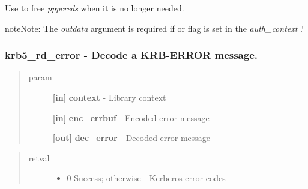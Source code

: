 \documentclass[letterpaper,10pt,english]{sphinxmanual}
\begin{document}
Use {\hyperref[appdev/refs/api/krb5_free_tgt_creds:krb5_free_tgt_creds]{}} to free \emph{pppcreds} when it is no longer needed.

\begin{notice}{note}{Note:}
The \emph{outdata} argument is required if {\hyperref[appdev/refs/macros/KRB5_AUTH_CONTEXT_RET_TIME:KRB5_AUTH_CONTEXT_RET_TIME]{}} or {\hyperref[appdev/refs/macros/KRB5_AUTH_CONTEXT_RET_SEQUENCE:KRB5_AUTH_CONTEXT_RET_SEQUENCE]{}} flag is set in the \emph{auth\_context} .{}`
\end{notice}


\subsubsection{krb5\_rd\_error -  Decode a KRB-ERROR message.}
\label{appdev/refs/api/krb5_rd_error:krb5-rd-error-decode-a-krb-error-message}\label{appdev/refs/api/krb5_rd_error::doc}

\begin{fulllineitems}
\label{appdev/refs/api/krb5_rd_error:krb5_rd_error}
\end{fulllineitems}

\begin{quote}\begin{description}
\item[{param}] \leavevmode
\textbf{{[}in{]}} \textbf{context} - Library context

\textbf{{[}in{]}} \textbf{enc\_errbuf} - Encoded error message

\textbf{{[}out{]}} \textbf{dec\_error} - Decoded error message

\end{description}\end{quote}
\begin{quote}\begin{description}
\item[{retval}] \leavevmode\begin{itemize}
\item {} 
0   Success; otherwise - Kerberos error codes

\end{itemize}

\end{description}\end{quote}
\end{document}
